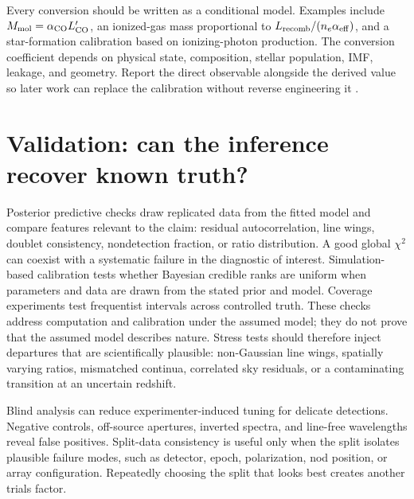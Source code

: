 Every conversion should be written as a conditional model.  Examples include
$M_{\rm mol}=\alpha_{\rm CO}L'_{\rm CO}$, an ionized-gas mass proportional to
$L_{\rm recomb}/(n_e\alpha_{\rm eff})$, and a star-formation calibration based
on ionizing-photon production.  The conversion coefficient depends on physical
state, composition, stellar population, IMF, leakage, and geometry.  Report the
direct observable alongside the derived value so later work can replace the
calibration without reverse engineering it \citep{KennicuttEvans2012}.

\section{Validation: can the inference recover known truth?}

Posterior predictive checks draw replicated data from the fitted model and
compare features relevant to the claim: residual autocorrelation, line wings,
doublet consistency, nondetection fraction, or ratio distribution.  A good
global $\chi^2$ can coexist with a systematic failure in the diagnostic of
interest.  Simulation-based calibration tests whether Bayesian credible ranks
are uniform when parameters and data are drawn from the stated prior and model.
Coverage experiments test frequentist intervals across controlled truth.
These checks address computation and calibration under the assumed model; they
do not prove that the assumed model describes nature.  Stress tests should
therefore inject departures that are scientifically plausible: non-Gaussian
line wings, spatially varying ratios, mismatched continua, correlated sky
residuals, or a contaminating transition at an uncertain redshift.

Blind analysis can reduce experimenter-induced tuning for delicate detections.
Negative controls, off-source apertures, inverted spectra, and line-free
wavelengths reveal false positives.  Split-data consistency is useful only when
the split isolates plausible failure modes, such as detector, epoch,
polarization, nod position, or array configuration.  Repeatedly choosing the
split that looks best creates another trials factor.

